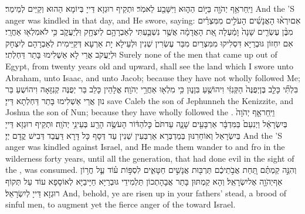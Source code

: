 {וַיִּֽחַר\maqqaf אַ֥ף יְהֹוָ֖ה בַּיּ֣וֹם הַה֑וּא וַיִּשָּׁבַ֖ע לֵאמֹֽר׃}
{וּתְקֵיף רוּגְזָא דַּייָ בְּיוֹמָא הַהוּא וְקַיֵּים לְמֵימַר׃}
{And the \lord’S anger was kindled in that day, and He swore, saying:}{}
{אִם\maqqaf יִרְא֨וּ הָאֲנָשִׁ֜ים הָעֹלִ֣ים מִמִּצְרַ֗יִם מִבֶּ֨ן עֶשְׂרִ֤ים שָׁנָה֙ וָמַ֔עְלָה אֵ֚ת הָאֲדָמָ֔ה אֲשֶׁ֥ר נִשְׁבַּ֛עְתִּי לְאַבְרָהָ֥ם לְיִצְחָ֖ק וּֽלְיַעֲקֹ֑ב כִּ֥י לֹא\maqqaf מִלְא֖וּ אַחֲרָֽי׃}
{אִם יִחְזוֹן גּוּבְרַיָּא דִּסְלִיקוּ מִמִּצְרַיִם מִבַּר עֶשְׂרִין שְׁנִין וּלְעֵילָא יָת אַרְעָא דְּקַיֵּימִית לְאַבְרָהָם לְיִצְחָק וּלְיַעֲקֹב אֲרֵי לָא אַשְׁלִימוּ בָּתַר דַּחְלְתִי׃}
{Surely none of the men that came up out of Egypt, from twenty years old and upward, shall see the land which I swore unto Abraham, unto Isaac, and unto Jacob; because they have not wholly followed Me;}{}
{בִּלְתִּ֞י כָּלֵ֤ב בֶּן\maqqaf יְפֻנֶּה֙ הַקְּנִזִּ֔י וִיהוֹשֻׁ֖עַ בִּן\maqqaf נ֑וּן כִּ֥י מִלְא֖וּ אַחֲרֵ֥י יְהֹוָֽה׃}
{אֱלָהֵין כָּלֵב בַּר יְפֻנֶּה קְנִזָּאָה וִיהוֹשֻעַ בַּר נוּן אֲרֵי אַשְׁלִימוּ בָּתַר דַּחְלְתָא דַּייָ׃}
{save Caleb the son of Jephunneh the Kenizzite, and Joshua the son of Nun; because they have wholly followed the \lord.}{}
{וַיִּֽחַר\maqqaf אַ֤ף יְהֹוָה֙ בְּיִשְׂרָאֵ֔ל וַיְנִעֵם֙ בַּמִּדְבָּ֔ר אַרְבָּעִ֖ים שָׁנָ֑ה עַד\maqqaf תֹּם֙ כׇּל\maqqaf הַדּ֔וֹר הָעֹשֶׂ֥ה הָרַ֖ע בְּעֵינֵ֥י יְהֹוָֽה׃}
{וּתְקֵיף רוּגְזָא דַּייָ בְּיִשְׂרָאֵל וְאוֹחַרִנּוּן בְּמַדְבְּרָא אַרְבְּעִין שְׁנִין עַד דְּסָף כָּל דָּרָא דַּעֲבַד דְּבִישׁ קֳדָם יְיָ׃}
{And the \lord’S anger was kindled against Israel, and He made them wander to and fro in the wilderness forty years, until all the generation, that had done evil in the sight of the \lord, was consumed.}{}
{וְהִנֵּ֣ה קַמְתֶּ֗ם תַּ֚חַת אֲבֹ֣תֵיכֶ֔ם תַּרְבּ֖וּת אֲנָשִׁ֣ים חַטָּאִ֑ים לִסְפּ֣וֹת ע֗וֹד עַ֛ל חֲר֥וֹן אַף\maqqaf יְהֹוָ֖ה אֶל\maqqaf יִשְׂרָאֵֽל׃}
{וְהָא קַמְתּוּן בָּתַר אֲבָהָתְכוֹן תַּלְמִידֵי גּוּבְרַיָּא חַיָּיבַיָּא לְאוֹסָפָא עוֹד עַל תְּקוֹף רוּגְזָא דַּייָ לְיִשְׂרָאֵל׃}
{And, behold, ye are risen up in your fathers’ stead, a brood of sinful men, to augment yet the fierce anger of the \lord\space toward Israel.}{}
